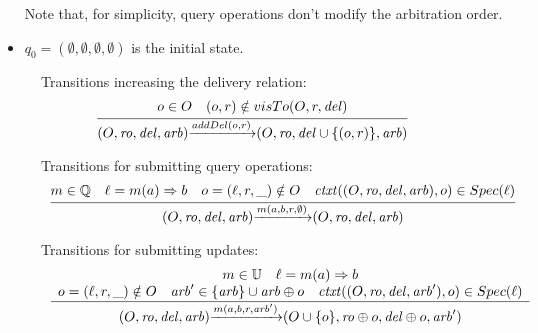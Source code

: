 \begin{itemize}
\begin {itemize}
    \end{itemize}
Note that, for simplicity, query operations don't modify the arbitration order.

\item[-] $q_0=(\emptyset,\emptyset,\emptyset,\emptyset)$ is the initial state.
\end{itemize}

\begin{figure}[ht]
Transitions increasing the delivery relation:
\[
\begin{array}{l c}
\bigfrac{ o \in O\quad (o,r)\notin visTo(O,r,\mathit{del}) }
{ (O,\mathit{ro},\mathit{del},\mathit{arb}) {\xrightarrow{addDel(o,r)}} (O,\mathit{ro},\mathit{del} \cup \{ (o,r) \},\mathit{arb}) } %
\end{array}
\]


Transitions for submitting query operations:
\[
\begin{array}{l c}
\bigfrac{ m \in \mathbb{Q}\quad \ell = m(a) \Rightarrow b\quad o=(\ell,r,\_) \notin O\quad {\mathit{ctxt}}((O,\mathit{ro},\mathit{del},\mathit{arb}),o) \in Spec(\ell) }
{ (O,\mathit{ro},\mathit{del},\mathit{arb}) {\xrightarrow{m(a,b,r,\emptyset)}} (O,\mathit{ro},\mathit{del},\mathit{arb}) } %
\end{array}
\]


Transitions for submitting updates:
\[
\begin{array}{l c}
\bigfrac{ 
\begin{array}{c}
 m \in \mathbb{U}\quad \ell = m(a) \Rightarrow b\\
o = (\ell,r,\_) \notin O\quad \mathit{arb}'\in \{\mathit{arb}\}\cup \mathit{arb}\oplus o
\quad
  {\mathit{ctxt}}((O,\mathit{ro},\mathit{del},\mathit{arb}'),o) \in Spec(\ell) 
\end{array}
  }
{ (O,\mathit{ro},\mathit{del},\mathit{arb}) {\xrightarrow{m(a,b,r,\mathit{arb}')}} (O \cup \{ o \},\mathit{ro} \oplus o ,\mathit{del} \oplus o,\mathit{arb}') } %
\end{array}
\]


\end{figure}
